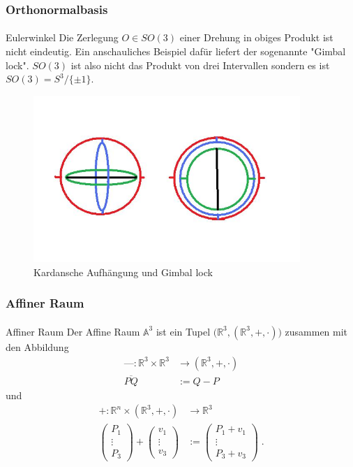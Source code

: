 \documentclass{beamer}
\begin{document}
\begin{frame}
    \frametitle{Orthonormalbasis}
\framesubtitle{}
\begin{block}{Eulerwinkel}
Die  Zerlegung  $O \in SO(3)$  einer Drehung in obiges Produkt ist  nicht eindeutig.
Ein anschauliches Beispiel dafür liefert der sogenannte "Gimbal lock". $SO(3)$ ist also nicht das Produkt von drei Intervallen sondern
es ist $SO(3) = S^{3}/ \{ \pm 1 \}$.

\begin{figure}[H]
    \centering
    \includegraphics[width=0.9\textwidth]{images/gimbalLock.jpg}
    \caption{Kardansche Aufhängung und Gimbal lock}
    \label{fig:gimbal+lock}
\end{figure}

\end{block}

\end{frame}


\begin{frame}
    \frametitle{Affiner Raum}
\framesubtitle{}
\begin{block}{Affiner Raum}
Der Affine Raum $\mathbb{A}^3$ ist ein Tupel $\bigl( \mathbb{R}^3, (\mathbb{R}^3, + , \cdot ) \bigr )$
zusammen mit den Abbildung 
\begin{align*}
\text{---} : \mathbb{R}^3 \times \mathbb{R}^3  & \to (\mathbb{R}^3, + , \cdot ) \\
\overline{PQ} & := Q-P  
\end{align*}
und
\begin{align*}
+ : \mathbb{R}^n \times (\mathbb{R}^3, + , \cdot )   & \to  \mathbb{R}^3\\
\begin{pmatrix}
P_1 \\ \vdots \\ P_3
\end{pmatrix} + \begin{pmatrix}
v_1 \\ \vdots \\ v_3
\end{pmatrix} & := \begin{pmatrix}
P_1  + v_1 \\ \vdots \\ P_3 + v_3
\end{pmatrix}   \;.
\end{align*}

\end{block}

\end{frame}
\end{document}
